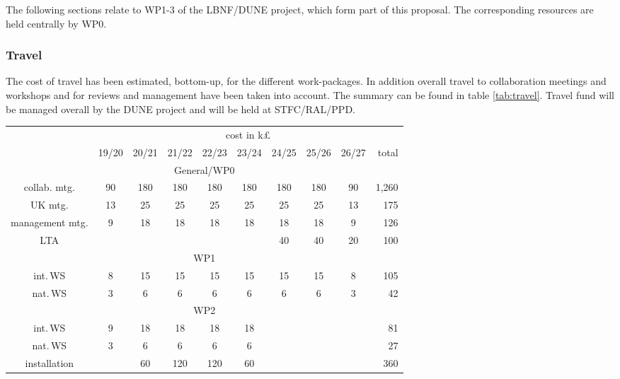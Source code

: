 The following sections relate to WP1-3 of the LBNF/DUNE project, which form part of this proposal. The corresponding resources are held centrally by WP0.

\subsubsection{Travel}
The cost of travel has been estimated, bottom-up, for the different work-packages. In addition overall travel to collaboration meetings and workshops and for reviews and management have been taken into account. The summary can be found in table \ref{tab:travel}. Travel fund will be managed overall by the DUNE project and will be held at STFC/RAL/PPD. 
\begin{table}[htb]
    \centering
    \begin{tabular}{|c||c|c|c|c|c|c|c|c||r|}
        \cline{2-10} \multicolumn{1}{c|}{\ } & \multicolumn{9}{c|}{cost in k£}\\
         \cline{2-10}
         \multicolumn{1}{c|}{\ } & 19/20 & 20/21 & 21/22 & 22/23 & 23/24 & 24/25 & 25/26 & 26/27 & total\\
         \cline{2-10}\hline
         \multicolumn{10}{|c|}{General/WP0 }\\
         \hline
         collab. mtg.    &  90 & 180 & 180 & 180 & 180 & 180 & 180 &  90 & 1,260 \\
         UK mtg.         &  13 & 25  &  25 &  25 &  25 &  25 &  25 & 13  & 175   \\
         management mtg. &   9 & 18  &  18 &  18 &  18 &  18 &  18 &   9 & 126  \\
         LTA             &     &     &     &     &     &  40 &  40 &  20 & 100  \\
         \hline
         \hline
         \multicolumn{10}{|c|}{WP1 }\\
         \hline
         int.\,WS       & 8 & 15  & 15  &  15 & 15  & 15  & 15 & 8 & 105  \\
         nat.\,WS       & 3 & 6   & 6   & 6   & 6   & 6   &  6 & 3 & 42 \\
         \hline\hline
         \multicolumn{10}{|c|}{WP2 }\\
         \cline{1-10}
         int.\,WS      &  9  & 18  & 18  & 18  & 18  &     &    &    & 81  \\
         nat.\,WS      &   3 & 6   &  6  & 6   &   6 &     &    &    & 27  \\
         installation  &     & 60  & 120 & 120 & 60  &     &    &    & 360  \\

\end{tabular}
\end{table}
